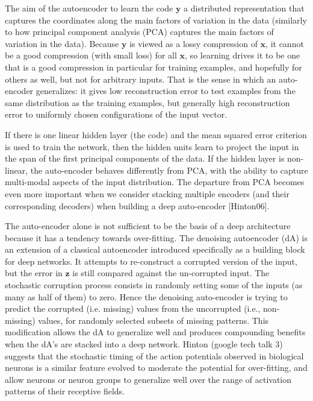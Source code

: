 \documentclass[12pt]{article}
\begin{document}
The aim of the autoencoder to learn the code $\mathbf y$ a distributed representation that captures the coordinates along the main factors of variation in the data (similarly to how principal component analysis (PCA) captures the main factors of variation in the data). Because $\mathbf y$ is viewed as a lossy compression of $\mathbf x$, it cannot be a good compression (with small loss) for all $\mathbf x$, so learning drives it to be one that is a good compression in particular for training examples, and hopefully for others as well, but not for arbitrary inputs. That is the sense in which an auto-encoder generalizes: it gives low reconstruction error to test examples from the same distribution as the training examples, but generally high reconstruction error to uniformly chosen configurations of the input vector.

If there is one linear hidden layer (the code) and the mean squared error criterion is used to train the network, then the  hidden units learn to project the input in the span of the first  principal components of the data. If the hidden layer is non-linear, the auto-encoder behaves differently from PCA, with the ability to capture multi-modal aspects of the input distribution. The departure from PCA becomes even more important when we consider stacking multiple encoders (and their corresponding decoders) when building a deep auto-encoder [Hinton06].

The auto-encoder alone is not sufficient to be the basis of a deep architecture because it has a tendency towards over-fitting. The denoising autoencoder (dA) is an extension of a classical autoencoder introduced specifically as a building block for deep networks\cite{Vincint08}.  It attempts to re-construct a corrupted version of the input, but the error in $\mathbf z$ is still compared against the un-corrupted input. The stochastic corruption process consists in randomly setting some of the inputs (as many as half of them) to zero. Hence the denoising auto-encoder is trying to predict the corrupted (i.e. missing) values from the uncorrupted (i.e., non-missing) values, for randomly selected subsets of missing patterns. This modification allows the dA to generalize well and produces compounding benefits when the dA's are stacked into a deep network\cite{Hinton06}. Hinton (google tech talk 3) suggests that the stochastic timing of the action potentials observed in biological neurons is a similar feature evolved to moderate the potential for over-fitting, and allow neurons or neuron groups to generalize well over the range of activation patterns of their receptive fields.
\end{document}
